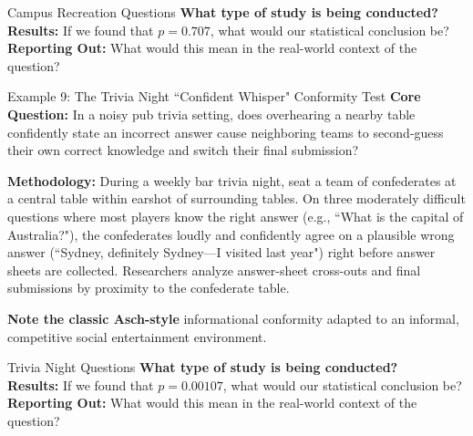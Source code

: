 \documentclass{beamer}
\begin{document}
\begin{frame}{Campus Recreation Questions}
\textbf{What type of study is being conducted?}\\[9mm]
\pause
\textbf{Results:} If we found that $p = 0.707$, what would our statistical conclusion be?\\[9mm]
\pause
\textbf{Reporting Out:} What would this mean in the real-world context of the question? 
\vspace{25mm}
\end{frame}

\begin{frame}{Example 9: The Trivia Night ``Confident Whisper" Conformity Test}
\textbf{Core Question:} In a noisy pub trivia setting, does overhearing a nearby table confidently state an incorrect answer cause neighboring teams to second-guess their own correct knowledge and switch their final submission?

\pause
\textbf{Methodology:} During a weekly bar trivia night, seat a team of confederates at a central table within earshot of surrounding tables. On three moderately difficult questions where most players know the right answer (e.g., ``What is the capital of Australia?"), the confederates loudly and confidently agree on a plausible wrong answer (``Sydney, definitely Sydney—I visited last year") right before answer sheets are collected. Researchers analyze answer-sheet cross-outs and final submissions by proximity to the confederate table.

\pause
\footnotesize{ \textbf{Note the classic Asch-style} informational conformity adapted to an informal, competitive social entertainment environment.}
\end{frame}

\begin{frame}{Trivia Night Questions}
\textbf{What type of study is being conducted?}\\[9mm]
\pause
\textbf{Results:} If we found that $p = 0.00107$, what would our statistical conclusion be?\\[9mm]
\pause
\textbf{Reporting Out:} What would this mean in the real-world context of the question? 
\vspace{25mm}
\end{frame}
\end{document}
